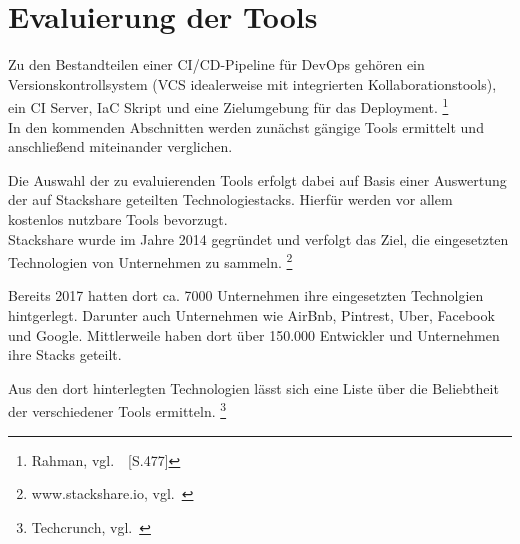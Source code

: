 \section{Evaluierung der Tools}\label{evaluierung}

Zu den Bestandteilen einer CI/CD-Pipeline für DevOps gehören ein Versionskontrollsystem (VCS idealerweise mit integrierten Kollaborationstools),
ein CI Server, IaC Skript und eine Zielumgebung für das Deployment.
\footnote{Rahman, vgl.~\cite{Rahman2018c}~[S.477]} \\

In den kommenden Abschnitten werden zunächst gängige Tools ermittelt und anschließend miteinander verglichen.

Die Auswahl der zu evaluierenden Tools erfolgt dabei auf Basis einer Auswertung der auf Stackshare geteilten Technologiestacks.
Hierfür werden vor allem kostenlos nutzbare Tools bevorzugt. \\

Stackshare wurde im Jahre 2014 gegründet und verfolgt das Ziel, die eingesetzten Technologien von Unternehmen zu sammeln.
\footnote{www.stackshare.io, vgl.~\cite{STACKSHARE_HOME}}

Bereits 2017 hatten dort ca. 7000 Unternehmen ihre eingesetzten Technolgien hintgerlegt.
Darunter auch Unternehmen wie AirBnb, Pintrest, Uber, Facebook und Google.
Mittlerweile haben dort über 150.000 Entwickler und Unternehmen ihre Stacks geteilt.

Aus den dort hinterlegten Technologien lässt sich eine Liste über die Beliebtheit der verschiedener Tools ermitteln.
\footnote{Techcrunch, vgl.~\cite{TECHCRUNCH_STACKSHARE}}